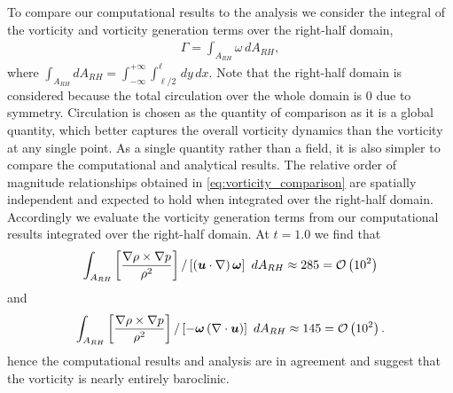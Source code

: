 To compare our computational results to the analysis we consider the
integral of the vorticity and vorticity generation terms over the
right-half domain,
\begin{align}
  \Gamma = \int_{A_{RH}} \omega \,dA_{RH},
\end{align}
where
$\int_{A_{RH}} dA_{RH} =
\int_{-\infty}^{+\infty}\int_{\ell/2}^{\ell} \,dy\, dx$. Note
that the right-half domain is considered because the total circulation
over the whole domain is $0$ due to symmetry. Circulation is chosen as
the quantity of comparison as it is a global quantity, which better
captures the overall vorticity dynamics than the vorticity at any
single point. As a single quantity rather than a field, it is also
simpler to compare the computational and analytical results. The
relative order of magnitude relationships obtained in
\eqref{eq:vorticity_comparison} are spatially independent and expected
to hold when integrated over the right-half domain. Accordingly we
evaluate the vorticity generation terms from our computational results
integrated over the right-half domain. At $t=1.0$ we find that %
$$ \int_{A_{RH}} \left[\frac{\nabla\rho\times\nabla p}{\rho^2}\right] / \left[\left(\boldsymbol{u}\cdot\nabla\right)\boldsymbol{\omega}\right]\,\,dA_{RH}\approx 285=\mathcal{O}\left(10^2\right)$$
and
$$ \int_{A_{RH}} \left[\frac{\nabla\rho\times\nabla p}{\rho^2}\right] / \left[-\boldsymbol{\omega}\left(\nabla\cdot\boldsymbol{u}\right)\right]\,\,dA_{RH} \approx 145=\mathcal{O}\left(10^2\right).$$
%
hence the computational results and analysis are in agreement and suggest
that the vorticity is nearly entirely baroclinic.
% 

